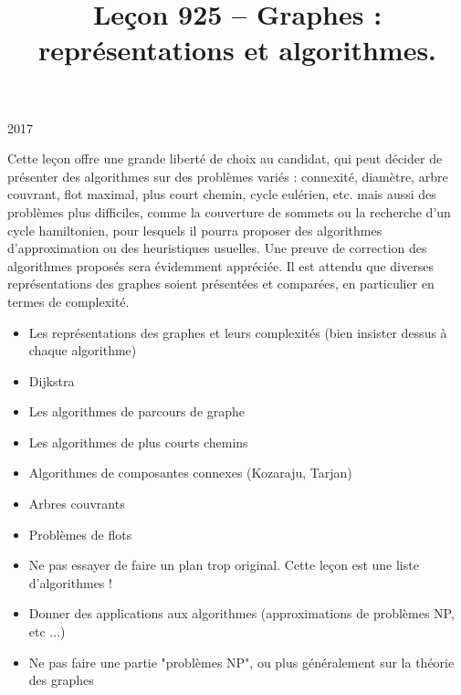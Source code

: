 \documentclass{agregfiche}
\title{Leçon 925 -- Graphes : représentations et algorithmes.}
\begin{document}
\maketitle

\secrapports

\begin{rapport}{2017}

Cette leçon offre une grande liberté de choix au candidat, qui peut décider de présenter des algorithmes sur des problèmes variés : connexité, diamètre, arbre couvrant, flot maximal, plus court chemin, cycle eulérien, etc. mais aussi des problèmes plus difficiles, comme la couverture de sommets ou la recherche d’un cycle hamiltonien, pour lesquels il pourra proposer des algorithmes d’approximation ou des heuristiques usuelles. Une preuve de correction des algorithmes proposés sera évidemment appréciée. Il est attendu que diverses représentations des graphes soient présentées et comparées, en particulier en termes de complexité.

\end{rapport}

\secindispensables

\begin{itemize}
    \item Les représentations des graphes et leurs complexités
        (bien insister dessus à chaque algorithme)
    \item Dijkstra

\end{itemize}

\secasavoir
\begin{itemize}
	\item Les algorithmes de parcours de graphe
	\item Les algorithmes de plus courts chemins
\end{itemize}
\secidees

\begin{itemize}
	\item Algorithmes de composantes connexes (Kozaraju, Tarjan)
	\item Arbres couvrants
	\item Problèmes de flots
\end{itemize}

\secpieges

\begin{itemize}
    \item Ne pas essayer de faire un plan trop original. Cette leçon est une
        liste d'algorithmes !
    \item Donner des applications aux algorithmes (approximations de problèmes
        NP, etc ...)
    \item Ne pas faire une partie "problèmes NP", ou plus généralement 
        sur la théorie des graphes
\end{itemize}
\end{document}
